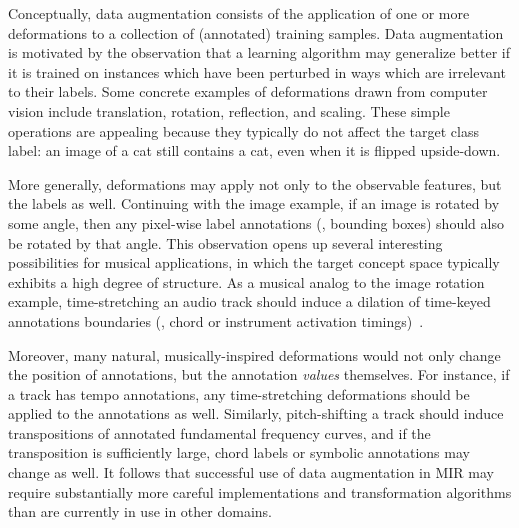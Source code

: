 \documentclass{article}
\begin{document}
Conceptually, data augmentation consists of the application of one or more deformations to
a collection of (annotated) training samples.
Data augmentation is motivated by the observation that a learning algorithm may
generalize better if it is trained on instances which have been perturbed in ways 
which are irrelevant to their labels.
Some concrete examples of deformations drawn from computer vision include translation,
rotation, reflection, and scaling.
These simple operations are appealing because they typically do not affect the target 
class label: an image of a cat still contains a cat, even when it is flipped upside-down.

More generally, deformations may apply not only to the observable features, but the labels as well.
Continuing with the image example, if an image is rotated by some angle, 
then any pixel-wise label annotations (\eg, bounding boxes) should also be rotated by
that angle.
This observation opens up several interesting possibilities for musical applications, in
which the target concept space typically exhibits a high degree of structure.
As a musical analog to the image rotation example, time-stretching an audio track 
should induce a dilation of time-keyed annotations boundaries (\eg, chord or instrument
activation timings)~\cite{mauch2013audio}.

Moreover, many natural, musically-inspired deformations
would not only change the position of annotations, but the annotation
\emph{values} themselves.
For instance, if a track has tempo annotations, any time-stretching deformations should
be applied to the annotations as well.
Similarly, pitch-shifting a track should induce transpositions of annotated fundamental
frequency curves, and if the transposition is sufficiently large, chord labels or symbolic 
annotations may change as well.
It follows that successful use of data augmentation in MIR may require
substantially more careful implementations and transformation algorithms than are currently
in use in other domains.
\end{document}
